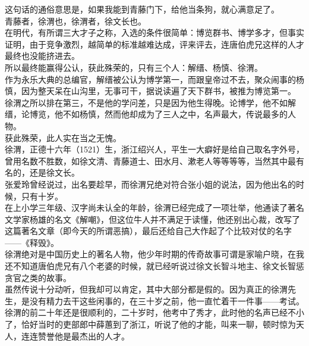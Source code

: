 \begin{multicols}{\theparacolNo}
这句话的通俗意思是，如果我能到青藤门下，给他当条狗，就心满意足了。\\

青藤者，徐渭也，徐渭者，徐文长也。\\

在明代，有所谓三大才子之称，入选的条件很简单：博览群书、博学多才，但事实证明，由于竞争激烈，越简单的标准越难达成，评来评去，连唐伯虎兄这样的人才最终也没能挤进去。\\

所以最终能赢得公认，获此殊荣的，只有三个人：解缙、杨慎、徐渭。\\

作为永乐大典的总编官，解缙被公认为博学第一，而跟皇帝过不去，聚众闹事的杨慎，因为整天呆在山沟里，无事可干，据说读遍了天下群书，被推为博览第一。\\

徐渭之所以排在第三，不是他的学问差，只是因为他生得晚。论博学，他不如解缙，论博览，他不如杨慎，然而他却成为了三人之中，名声最大，传说最多的人物。\\

获此殊荣，此人实在当之无愧。\\

徐渭，正德十六年（1521）生，浙江绍兴人，平生一大癖好是给自己取名字外号，曾用名数不胜数，如徐文清、青藤道士、田水月、漱老人等等等等，当然其中最有名的，还是徐文长。\\

张爱玲曾经说过，出名要趁早，而徐渭兄绝对符合张小姐的说法，因为他出名的时候，只有十岁。\\

在上小学三年级、汉字尚未认全的年龄，徐渭已经完成了一项壮举，他通读了著名文学家杨雄的名文《解嘲》，但这位牛人并不满足于读懂，他还别出心裁，改写了这篇著名文章（即今天的所谓恶搞），最后还给自己大作起了个比较对仗的名字——《释毁》。\\

徐渭绝对是中国历史上的著名人物，他少年时期的传奇故事可谓是家喻户晓，在我还不知道唐伯虎兄有八个老婆的时候，就已经听说过徐文长智斗地主、徐文长智惩贪官之类的故事。\\

虽然传说十分动听，但我却可以肯定，其中大部分都是假的。因为真正的徐渭先生，是没有精力去干这些闲事的，在三十岁之前，他一直忙着干一件事——考试。\\

徐渭的前二十年还是很顺利的，二十岁时，他考中了秀才，此时他的名声已经不小了，恰好当时的吏部郎中薛蕙到了浙江，听说了他的才能，叫来一聊，顿时惊为天人，连连赞誉他是最杰出的人才。\\


\end{multicols}
